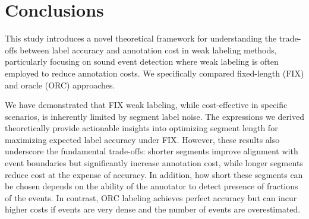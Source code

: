 

\section{Conclusions}
\label{sec:conclusion}

This study introduces a novel theoretical framework for understanding the trade-offs between label accuracy and annotation cost in weak labeling methods, particularly focusing on sound event detection where weak labeling is often employed to reduce annotation costs. We specifically compared fixed-length (FIX) and oracle (ORC) approaches.

We have demonstrated that FIX weak labeling, while cost-effective in specific scenarios, is inherently limited by segment label noise. The expressions we derived theoretically provide actionable insights into optimizing segment length for maximizing expected label accuracy under FIX. However, these results also underscore the fundamental trade-offs: shorter segments improve alignment with event boundaries but significantly increase annotation cost, while longer segments reduce cost at the expense of accuracy. In addition, how short these segments can be chosen depends on the ability of the annotator to detect presence of fractions of the events. In contrast, ORC labeling achieves perfect accuracy but can incur higher costs if events are very dense and the number of events are overestimated.

